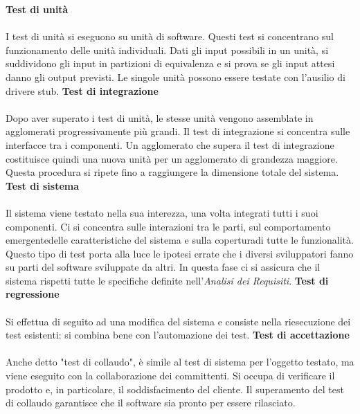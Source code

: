 		 \newline \newline
			\textbf{Test di unità} \mbox{}\\ \mbox{}\\
			I test di unità si eseguono su unità di software. Questi test si concentrano sul funzionamento delle unità individuali. Dati gli input possibili in un unità, si suddividono gli input in partizioni di equivalenza e si prova se gli input attesi danno gli output previsti. Le singole unità possono essere testate con l'ausilio di driver\glosp e stub\glosp. \newline \newline
			\textbf{Test di integrazione} \mbox{}\\ \mbox{}\\
			Dopo aver superato i test di unità, le stesse unità vengono assemblate in agglomerati progressivamente più grandi. Il test di integrazione si concentra sulle interfacce tra i componenti. Un agglomerato che supera il test di integrazione costituisce quindi una nuova unità per un agglomerato di grandezza maggiore. Questa procedura si ripete fino a raggiungere la dimensione totale del sistema. \newline \newline
			\textbf{Test di sistema} \mbox{}\\ \mbox{}\\
			Il sistema viene testato nella sua interezza, una volta integrati tutti i suoi componenti. Ci si concentra sulle interazioni tra le parti, sul comportamento emergente\glosp delle caratteristiche del sistema e sulla copertura\glosp di tutte le funzionalità. Questo tipo di test porta alla luce le ipotesi errate che i diversi sviluppatori fanno su parti del software sviluppate da altri.
			In questa fase ci si assicura che il sistema rispetti tutte le specifiche definite nell'\textit{Analisi dei Requisiti}. \newline \newline
			\textbf{Test di regressione} \mbox{}\\ \mbox{}\\
			Si effettua di seguito ad una modifica del sistema e consiste nella riesecuzione dei test esistenti: si combina bene con l'automazione dei test. \newline \newline
			\textbf{Test di accettazione} \mbox{}\\ \mbox{}\\
			Anche detto "test di collaudo", è simile al test di sistema per l'oggetto testato, ma viene eseguito con la collaborazione dei committenti. Si occupa di verificare il prodotto e, in particolare, il soddisfacimento del cliente. Il superamento del test di collaudo garantisce che il software sia pronto per essere rilasciato.
